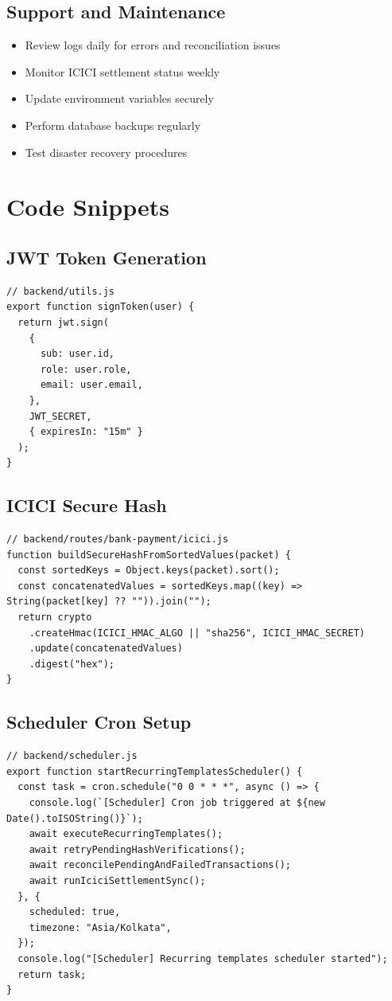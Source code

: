 \documentclass[12pt,a4paper]{article}
\begin{document}
\subsection{Support and Maintenance}
\begin{itemize}
  \item Review logs daily for errors and reconciliation issues
  \item Monitor ICICI settlement status weekly
  \item Update environment variables securely
  \item Perform database backups regularly
  \item Test disaster recovery procedures
\end{itemize}

\newpage
\appendix

\section{Code Snippets}
\label{appendix:snippets}

\subsection{JWT Token Generation}
\begin{lstlisting}
// backend/utils.js
export function signToken(user) {
  return jwt.sign(
    {
      sub: user.id,
      role: user.role,
      email: user.email,
    },
    JWT_SECRET,
    { expiresIn: "15m" }
  );
}
\end{lstlisting}

\subsection{ICICI Secure Hash}
\begin{lstlisting}
// backend/routes/bank-payment/icici.js
function buildSecureHashFromSortedValues(packet) {
  const sortedKeys = Object.keys(packet).sort();
  const concatenatedValues = sortedKeys.map((key) => String(packet[key] ?? "")).join("");
  return crypto
    .createHmac(ICICI_HMAC_ALGO || "sha256", ICICI_HMAC_SECRET)
    .update(concatenatedValues)
    .digest("hex");
}
\end{lstlisting}

\subsection{Scheduler Cron Setup}
\begin{lstlisting}
// backend/scheduler.js
export function startRecurringTemplatesScheduler() {
  const task = cron.schedule("0 0 * * *", async () => {
    console.log(`[Scheduler] Cron job triggered at ${new Date().toISOString()}`);
    await executeRecurringTemplates();
    await retryPendingHashVerifications();
    await reconcilePendingAndFailedTransactions();
    await runIciciSettlementSync();
  }, {
    scheduled: true,
    timezone: "Asia/Kolkata",
  });
  console.log("[Scheduler] Recurring templates scheduler started");
  return task;
}
\end{lstlisting}
\end{document}
